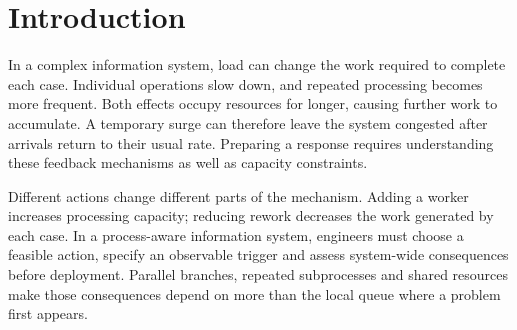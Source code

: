 \begin{abstract}
Increasing workload can slow individual operations and increase repeated processing, allowing congestion to persist after a demand surge. We study which dependencies an executable process model must preserve to prepare an effective response from logs recorded before sustained severe overload. The method learns service and routing behavior, compares feasible interventions under specified stresses, and fixes an action and observable trigger before independent evaluation. In the serial reference, retaining load dependencies reduces backlog and intervention cost by 38.2\% relative to static planning and 35.4\% relative to predictive component selection. A new evaluation covers 288 training datasets across six structures with parallel operations, alternative routes, multiple returns and competing resources. Under routing feedback, the complete pipeline with automatically discovered structure reduces mean normalized cost by 13.5\% relative to predictive selection; the adjusted 97.5\% difference interval is $[-0.1353,-0.0343]$. Selecting a structure that preserves return behavior and observed route constraints also improves decisions over standard Inductive Miner. Benefits depend on the feedback mechanism and process. The results establish why response preparation requires both decision-relevant load dependencies and an executable structure that preserves the meaning of interventions.
\end{abstract}

\section{Introduction}
In a complex information system, load can change the work required to complete each case. Individual operations slow down, and repeated processing becomes more frequent. Both effects occupy resources for longer, causing further work to accumulate. A temporary surge can therefore leave the system congested after arrivals return to their usual rate. Preparing a response requires understanding these feedback mechanisms as well as capacity constraints.

Different actions change different parts of the mechanism. Adding a worker increases processing capacity; reducing rework decreases the work generated by each case. In a process-aware information system, engineers must choose a feasible action, specify an observable trigger and assess system-wide consequences before deployment. Parallel branches, repeated subprocesses and shared resources make those consequences depend on more than the local queue where a problem first appears.

